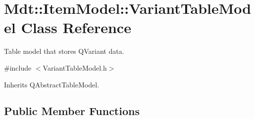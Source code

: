\hypertarget{class_mdt_1_1_item_model_1_1_variant_table_model}{}\section{Mdt\+:\+:Item\+Model\+:\+:Variant\+Table\+Model Class Reference}
\label{class_mdt_1_1_item_model_1_1_variant_table_model}


Table model that stores Q\+Variant data.  




{\ttfamily \#include $<$Variant\+Table\+Model.\+h$>$}



Inherits Q\+Abstract\+Table\+Model.

\subsection*{Public Member Functions}
